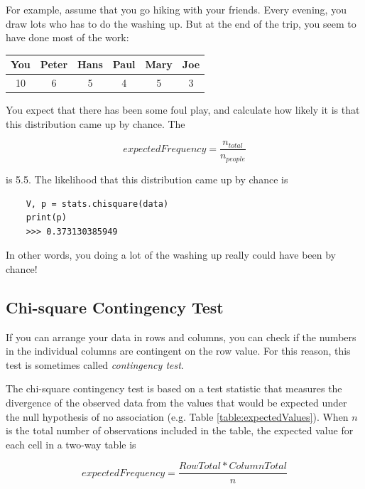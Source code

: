 For example, assume that you go hiking with your friends. Every evening, you draw lots who has to do the washing up.
But at the end of the trip, you seem to have done most of the work:

\begin{table}[h]
    \centering
    \begin{tabular}{c|c|c|c|c|c}
      You & Peter & Hans & Paul & Mary & Joe \\
      \hline
      10 & 6 & 5 & 4 & 5 & 3 \\
    \end{tabular}
\end{table}

You expect that there has been some foul play, and calculate how likely it is that this distribution came up by chance. The

\begin{equation}
  expectedFrequency = \frac{n_{total}}{n_{people}}
\end{equation}

is 5.5. The likelihood that this distribution came up by chance is

\begin{lstlisting}
    V, p = stats.chisquare(data)
    print(p)
    >>> 0.373130385949
\end{lstlisting}

In other words, you doing a lot of the washing up really could have been by chance!

\subsection{Chi-square Contingency Test} 

If you can arrange your data in rows and columns, you can check if the numbers in the individual columns are contingent on the row value. For this reason, this test is sometimes called \emph{contingency test}.

The chi-square contingency test is based on a test statistic that measures the divergence of the observed data from the values that would be expected under the null hypothesis of no association (e.g. Table \ref{table:expectedValues}). When $n$ is the total number of observations included in the table, the expected value for each cell in a two-way table is

\begin{equation}
  expectedFrequency = \frac{RowTotal * ColumnTotal}{n}
\end{equation}


